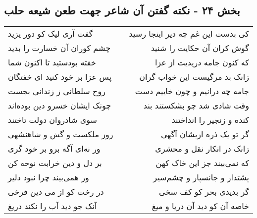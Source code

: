 \begin{center}
\section*{بخش ۲۴ - نکته گفتن آن شاعر جهت طعن شیعه حلب}
\label{sec:sh024}
\begin{longtable}{l p{0.5cm} r}
گفت آری لیک کو دور یزید
&&
کی بدست این غم چه دیر اینجا رسید
\\
چشم کوران آن خسارت را بدید
&&
گوش کران آن حکایت را شنید
\\
خفته بودستید تا اکنون شما
&&
که کنون جامه دریدیت از عزا
\\
پس عزا بر خود کنید ای خفتگان
&&
زانک بد مرگیست این خواب گران
\\
روح سلطانی ز زندانی بجست
&&
جامه چه درانیم و چون خاییم دست
\\
چونک ایشان خسرو دین بوده‌اند
&&
وقت شادی شد چو بشکستند بند
\\
سوی شادروان دولت تاختند
&&
کنده و زنجیر را انداختند
\\
روز ملکست و گش و شاهنشهی
&&
گر تو یک ذره ازیشان آگهی
\\
ور نه‌ای آگه برو بر خود گری
&&
زانک در انکار نقل و محشری
\\
بر دل و دین خرابت نوحه کن
&&
که نمی‌بیند جز این خاک کهن
\\
ور همی‌بیند چرا نبود دلیر
&&
پشتدار و جانسپار و چشم‌سیر
\\
در رخت کو از می دین فرخی
&&
گر بدیدی بحر کو کف سخی
\\
آنک جو دید آب را نکند دریغ
&&
خاصه آن کو دید آن دریا و میغ
\\
\end{longtable}
\end{center}
